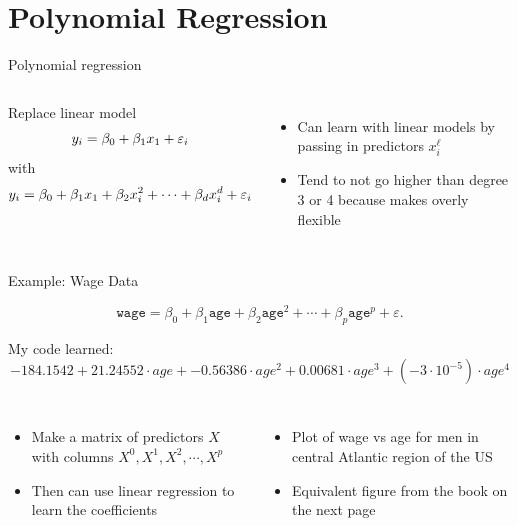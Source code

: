 \documentclass[aspectratio=169,usenames,dvipsnames]{beamer}
\newcommand{\InstructorNotes}[1]{\textit{\color{orange}#1}}
\newcommand{\InstructorList}[1]{
\begin{itemize}
	\color{orange}
	#1
\end{itemize}
}
\begin{document}



\section{Polynomial Regression}

\begin{frame}[c]{Polynomial regression}

\begin{columns}
\centering
Replace linear model
\begin{equation*}
	y_i = \beta_0 + \beta_1x_1 + \varepsilon_i
\end{equation*}
with
\begin{equation*}
	y_i = \beta_0 + \beta_1x_1 + \beta_2x_i^2 + \cdots + \beta_dx_i^d + \varepsilon_i
\end{equation*}

\centering
\InstructorList{
  \item Can learn with linear models by passing in predictors $x_i^\ell$
	\item Tend to not go higher than degree 3 or 4 because makes overly flexible
}

\end{columns}

\end{frame}
\begin{frame}[t]{Example: Wage Data}

	$$
\texttt{wage} = \beta_0 + \beta_1 \texttt{age} + \beta_2 \texttt{age}^2 + \cdots + \beta_p \texttt{age}^p +\varepsilon.
$$

   My code learned:
  $$
  -184.1542 + 21.24552 \cdot age + -0.56386 \cdot age^2 + 0.00681 \cdot age^3 + (-3\cdot 10^{-5}) \cdot age^4
  $$

\begin{columns}
\centering

\InstructorList{
	\item Make a matrix of predictors $X$ with columns $X^0, X^1, X^2, \cdots, X^p$
	\item Then can use linear regression to learn the coefficients
}
	
\centering
\InstructorList{
  \item Plot of wage vs age for men in central Atlantic region of the US
  \item Equivalent figure from the book on the next page
}
\end{columns}

\end{frame}
\end{document}
